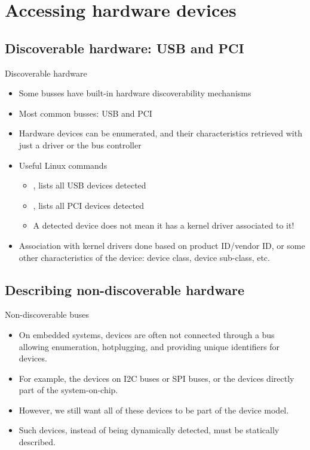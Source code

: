 \section{Accessing hardware devices}

\subsection{Discoverable hardware: USB and PCI}

\begin{frame}{Discoverable hardware}
  \begin{itemize}
  \item Some busses have built-in hardware discoverability mechanisms
  \item Most common busses: USB and PCI
  \item Hardware devices can be enumerated, and their characteristics
    retrieved with just a driver or the bus controller
  \item Useful Linux commands
    \begin{itemize}
    \item {}, lists all USB devices detected
    \item {}, lists all PCI devices detected
    \item A detected device does not mean it has a kernel driver
      associated to it!
    \end{itemize}
  \item Association with kernel drivers done based on product
    ID/vendor ID, or some other characteristics of the device: device
    class, device sub-class, etc.
  \end{itemize}
\end{frame}

\subsection{Describing non-discoverable hardware}

\begin{frame}{Non-discoverable buses}
  \begin{itemize}
  \item On embedded systems, devices are often not connected through a
    bus allowing enumeration, hotplugging, and providing unique
    identifiers for devices.
  \item For example, the devices on I2C buses or SPI buses, or the
    devices directly part of the system-on-chip.
  \item However, we still want all of these devices to be part of the
    device model.
  \item Such devices, instead of being dynamically detected, must be
    statically described.
  \end{itemize}
\end{frame}

